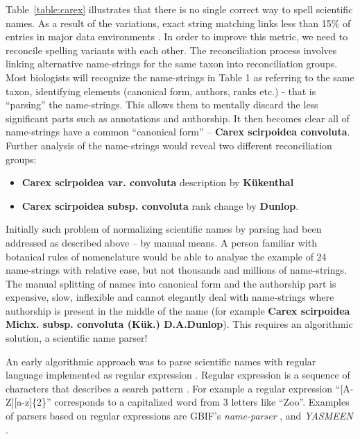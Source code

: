 \documentclass{bmcart}
\begin{document}
Table~\ref{table:carex} illustrates that there is no single correct way to
spell scientific names. As a result of the variations, exact string matching
links less than 15\% of entries in major data environments
\cite{Patterson:inpress-a}. In order to improve this metric, we need to
reconcile spelling variants with each other. The reconciliation process
involves linking alternative name-strings for the same taxon into
reconciliation groups. Most biologists will recognize the name-strings in Table
1 as referring to the same taxon, identifying elements (canonical form,
authors, ranks etc.) - that is ``parsing'' the name-strings.  This allows them
to mentally discard the less significant parts such as annotations and
authorship. It then becomes clear all of name-strings have a common ``canonical
form'' -- \textbf{Carex scirpoidea convoluta}. Further analysis of the
name-strings would reveal two different reconciliation groups:

\begin{itemize}

  \item \textbf{Carex scirpoidea var. convoluta} description by
    \textbf{Kükenthal}

  \item \textbf{Carex scirpoidea subsp. convoluta} rank change by
    \textbf{Dunlop}.

\end{itemize}

Initially such problem of normalizing scientific names by parsing had been
addressed as described above -- by manual means. A person familiar with
botanical rules of nomenclature would be able to analyse the example of 24
name-strings with relative ease, but not thousands and millions of
name-strings. The manual splitting of names into canonical form and the
authorship part is expensive, slow, inflexible and cannot elegantly deal with
name-strings where authorship is present in the middle of the name (for example
\textbf{Carex scirpoidea Michx. subsp.  convoluta (Kük.) D.A.Dunlop}).  This
requires an algorithmic solution, a scientific name parser!

An early algorithmic approach was to parse scientific names with regular
language implemented as regular expression \cite{Leary2007}. Regular expression
is a sequence of characters that describes a search pattern
\cite{aho1992foundations}. For example a regular expression ``[A-Z][a-z]\{2\}''
corresponds to a capitalized word from 3 letters like ``Zoo''. Examples of
parsers based on regular expressions are GBIF's \textit{name-parser}
\cite{gbifNameParser}, and \textit{YASMEEN} \cite{VandenBerghe2015}.
\end{document}
